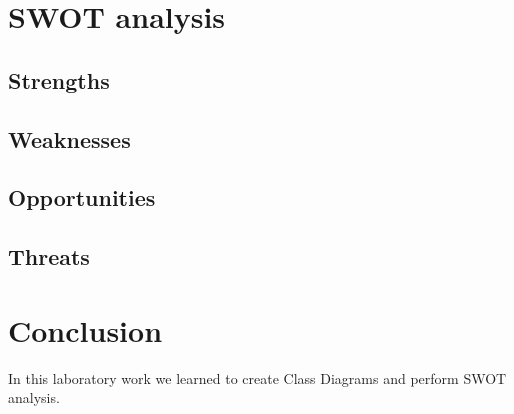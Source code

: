 \documentclass[12pt,a4paper,titlepage]{article}
\begin{document}
\section{SWOT analysis}
\subsection{Strengths}
\subsection{Weaknesses}
\subsection{Opportunities}
\subsection{Threats}

\section{Conclusion}
In this laboratory work we learned to create Class Diagrams and perform SWOT analysis.

\clearpage
\cleardoublepage
\end{document}
